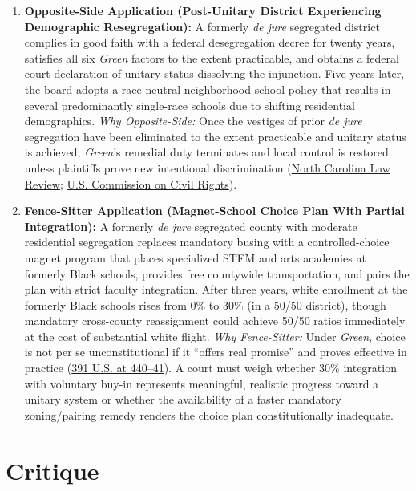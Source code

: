 \documentclass[12pt]{article}
\begin{document}
\begin{enumerate}
\item \textbf{Opposite-Side Application (Post-Unitary District Experiencing Demographic Resegregation):} A formerly \textit{de jure} segregated district complies in good faith with a federal desegregation decree for twenty years, satisfies all six \textit{Green} factors to the extent practicable, and obtains a federal court declaration of unitary status dissolving the injunction. Five years later, the board adopts a race-neutral neighborhood school policy that results in several predominantly single-race schools due to shifting residential demographics. \textit{Why Opposite-Side:} Once the vestiges of prior \textit{de jure} segregation have been eliminated to the extent practicable and unitary status is achieved, \textit{Green}'s remedial duty terminates and local control is restored unless plaintiffs prove new intentional discrimination (\href{https://scholarship.law.unc.edu/cgi/viewcontent.cgi?article=3435&context=nclr}{North Carolina Law Review}; \href{https://www.usccr.gov/files/historical/2006/06-006.pdf}{U.S. Commission on Civil Rights}).

\item \textbf{Fence-Sitter Application (Magnet-School Choice Plan With Partial Integration):} A formerly \textit{de jure} segregated county with moderate residential segregation replaces mandatory busing with a controlled-choice magnet program that places specialized STEM and arts academies at formerly Black schools, provides free countywide transportation, and pairs the plan with strict faculty integration. After three years, white enrollment at the formerly Black schools rises from 0\% to 30\% (in a 50/50 district), though mandatory cross-county reassignment could achieve 50/50 ratios immediately at the cost of substantial white flight. \textit{Why Fence-Sitter:} Under \textit{Green}, choice is not per se unconstitutional if it ``offers real promise'' and proves effective in practice (\href{https://supreme.justia.com/cases/federal/us/391/430/}{391 U.S. at 440--41}). A court must weigh whether 30\% integration with voluntary buy-in represents meaningful, realistic progress toward a unitary system or whether the availability of a faster mandatory zoning/pairing remedy renders the choice plan constitutionally inadequate.
\end{enumerate}

\section{Critique}
\end{document}
